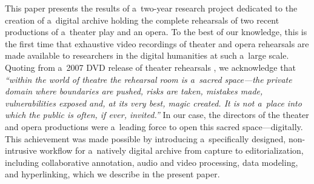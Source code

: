 \documentclass[conference]{IEEEtran}
\newcommand{\todo}[1]{\noindent\textcolor{red}{{\bf \{ToDo} #1{\bf \}}}}
\begin{document}
This paper presents the results of a~two-year research project dedicated to the creation of a~digital archive holding the complete rehearsals of two recent productions of a~theater play and an opera. To the best of our knowledge, this is the first time that exhaustive video recordings of theater and opera rehearsals are made available to researchers in the digital humanities at such a~large scale. Quoting from a~2007 DVD release of theater rehearsals \cite{Darling07}, we acknowledge that  {\em ``within the world of theatre the rehearsal room is a~sacred space---the private domain where boundaries are pushed, risks are taken, mistakes made, vulnerabilities exposed and, at its very best, magic created. It is not a~place into which the public is often, if ever, invited.''} In our case, the directors of the theater and opera productions were a~leading force to open this sacred space---digitally.  This achievement was made possible by introducing a~specifically designed, non-intrusive workflow for a~natively digital archive from capture to editorialization, including collaborative annotation, audio and video processing, data modeling,  and hyperlinking, which we describe in the present paper.





\end{document}
